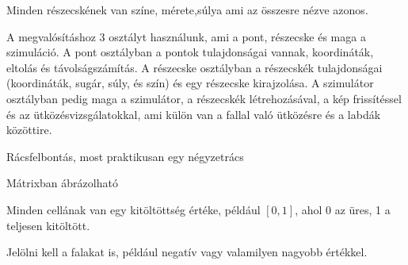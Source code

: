 Minden részecskének van színe, mérete,súlya ami az összesre nézve azonos. 

A megvalósításhoz 3 osztályt használunk, ami a pont, részecske és maga a szimuláció. A pont osztályban a pontok tulajdonságai vannak, koordináták, eltolás és távolságszámítás.  A részecske osztályban  a részecskék tulajdonságai (koordináták, sugár, súly, és szín) és egy részecske kirajzolása. A szimulátor osztályban pedig maga a szimulátor, a részecskék létrehozásával, a kép frissítéssel és az ütközésvizsgálatokkal, ami külön van a fallal való ütközésre és a labdák közöttire. 


Rácsfelbontás, most praktikusan egy négyzetrács

Mátrixban ábrázolható

Minden cellának van egy kitöltöttség értéke, például $[0, 1]$, ahol 0 az üres, 1 a teljesen kitöltött.

Jelölni kell a falakat is, például negatív vagy valamilyen nagyobb értékkel.
